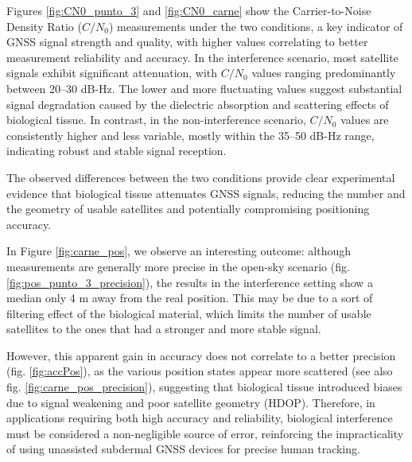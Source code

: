 Figures \ref{fig:CN0_punto_3} and \ref{fig:CN0_carne} show the Carrier-to-Noise Density Ratio (\(C/N_0\)) measurements under the two conditions, a key indicator of GNSS signal strength and quality, with higher values correlating to better measurement reliability and accuracy. In the interference scenario, most satellite signals exhibit significant attenuation, with \(C/N_0\) values ranging predominantly between 20–30 dB-Hz. The lower and more fluctuating values suggest substantial signal degradation caused by the dielectric absorption and scattering effects of biological tissue. In contrast, in the non-interference scenario, \(C/N_0\) values are consistently higher and less variable, mostly within the 35–50 dB-Hz range, indicating robust and stable signal reception. 

The observed differences between the two conditions provide clear experimental evidence that biological tissue attenuates GNSS signals, reducing the number and the geometry of usable satellites and potentially compromising positioning accuracy. 

In Figure \ref{fig:carne_pos}, we observe an interesting outcome: although measurements are generally more precise in the open-sky scenario (fig. \ref{fig:pos_punto_3_precision}), the results in the interference setting show a median only 4 m away from the real position. This may be due to a sort of filtering effect of the biological material, which limits the number of usable satellites to the ones that had a stronger and more stable signal.

However, this apparent gain in accuracy does not correlate to a better precision (fig. \ref{fig:accPos}), as the various position states appear more scattered (see also fig. \ref{fig:carne_pos_precision}), suggesting that biological tissue introduced biases due to signal weakening and poor satellite geometry (HDOP). Therefore, in applications requiring both high accuracy and reliability, biological interference must be considered a non-negligible source of error, reinforcing the impracticality of using unassisted subdermal GNSS devices for precise human tracking.